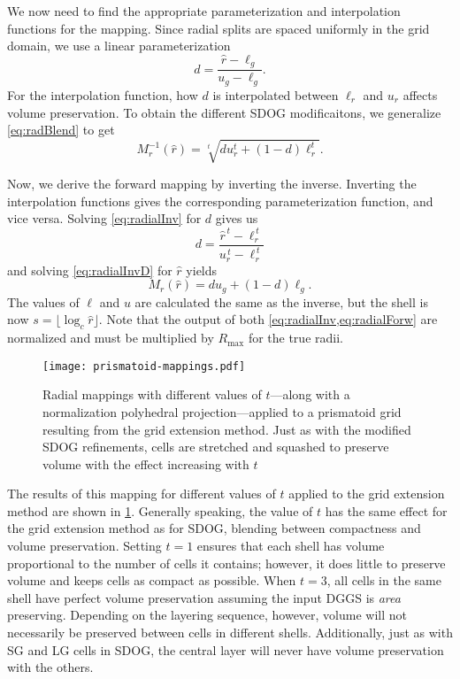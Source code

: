 We now need to find the appropriate parameterization and interpolation functions for the mapping.
Since radial splits are spaced uniformly in the grid domain, we use a linear parameterization
%
\begin{equation} \label{eq:radialInvD}
d = \frac{ \hat{r} - \ell_g }{ u_g - \ell_g }.
\end{equation}
%
For the interpolation function, how $d$ is interpolated between $\ell_r$ and $u_r$ affects volume preservation.
To obtain the different SDOG modificaitons, we generalize \cref{eq:radBlend} to get
%
\begin{equation} \label{eq:radialInv}
M_r^{-1}(\hat{r}) = \sqrt[t]{ d u_r^{t} + \left( 1 - d \right) \ell_r^{t} }.
\end{equation}
%


Now, we derive the forward mapping by inverting the inverse.
Inverting the interpolation functions gives the corresponding parameterization function, and vice versa.
Solving \cref{eq:radialInv} for $d$ gives us
%
\begin{equation} \label{eq:radialForwD}
d = \frac{ \hat{r}^{\,t} - \ell_r^{\,t} }{ u_r^{\,t} - \ell_r^{\,t} }
\end{equation}
%
and solving \cref{eq:radialInvD} for $\hat{r}$ yields
%
\begin{equation} \label{eq:radialForw}
M_r (\hat{r}) = d u_g + \left( 1 - d \right) \ell_g.
\end{equation}
%
The values of $\ell$ and $u$ are calculated the same as the inverse, but the shell is now $s = \lfloor \log_{c} \hat{r} \rfloor$.
Note that the output of both \cref{eq:radialInv,eq:radialForw} are normalized and must be multiplied by $R_\mathrm{max}$ for the true radii.


\begin{figure}[ht!]
	\centering
	\texttt{[image: prismatoid-mappings.pdf]}
	\caption[Radial mappings applied to the grid extension method]{
		Radial mappings with different values of $t$---along with a normalization polyhedral projection---applied to a prismatoid grid resulting from the grid extension method.
		Just as with the modified SDOG refinements, cells are stretched and squashed to preserve volume with the effect increasing with $t$
	}
	\label{fig:prismatoid-mappings}
\end{figure}


The results of this mapping for different values of $t$ applied to the grid extension method are shown in \cref{fig:prismatoid-mappings}.
Generally speaking, the value of $t$ has the same effect for the grid extension method as for SDOG, blending between compactness and volume preservation.
Setting $t=1$ ensures that each shell has volume proportional to the number of cells it contains; however, it does little to preserve volume and keeps cells as compact as possible.
When $t=3$, all cells in the same shell have perfect volume preservation assuming the input DGGS is \textit{area} preserving.
Depending on the layering sequence, however, volume will not necessarily be preserved between cells in different shells.
Additionally, just as with SG and LG cells in SDOG, the central layer will never have volume preservation with the others.


